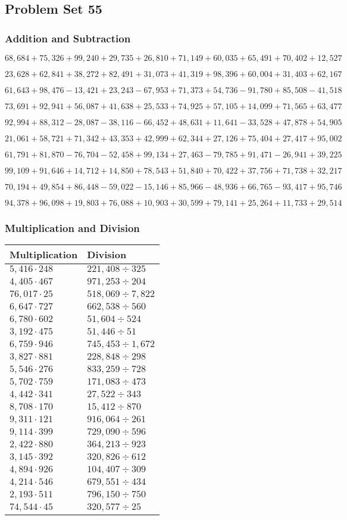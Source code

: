 \hypertarget{problem-set-55-3}{%
\subsection{Problem Set 55}\label{problem-set-55-3}}

\hypertarget{addition-and-subtraction-277}{%
\subsubsection{Addition and
Subtraction}\label{addition-and-subtraction-277}}

\(68,684+75,326+99,240+29,735+26,810+71,149+60,035+65,491+70,402+ 12,527\)

\(23,628+62,841+38,272+82,491+31,073+41,319+98,396+60,004+31,403+62,167\)

\(61,643+98,476-13,421+23,243-67,953+71,373+54,736-91,780+85,508-41,518\)

\(73,691+92,941+56,087+41,638+25,533+74,925+57,105+14,099+71,565+63,477\)

\(92,994+88,312-28,087-38,116-66,452+48,631+11,641-33,528+47,878+54,905\)

\(21,061+58,721+71,342+43,353+42,999+62,344+27,126+75,404+27,417+95,002\)

\(61,791+81,870-76,704-52,458+99,134+27,463-79,785+91,471-26,941+39,225\)

\(99,109+91,646+14,712+14,850+78,543+51,840+70,422+37,756+71,738+32,217\)

\(70,194+49,854+86,448-59,022-15,146+85,966-48,936+66,765-93,417+95,746\)

\(94,378+96,098+19,803+76,088+10,903+30,599+79,141+25,264+11,733+29,514\)

\hypertarget{multiplication-and-division-276}{%
\subsubsection{Multiplication and
Division}\label{multiplication-and-division-276}}

\begin{longtable}[]{@{}ll@{}}
\toprule
Multiplication & Division\tabularnewline
\midrule
\endhead
\(5,416\cdot248\) & \(221,408÷ 325\)\tabularnewline
\(4,405\cdot467\) & \(971,253÷204\)\tabularnewline
\(76,017\cdot25\) & \(518,069÷7,822\)\tabularnewline
\(6,647\cdot727\) & \(662,538÷560\)\tabularnewline
\(6,780\cdot602\) & \(51,604÷524\)\tabularnewline
\(3,192\cdot475\) & \(51,446÷51\)\tabularnewline
\(6,759\cdot946\) & \(745,453÷1,672\)\tabularnewline
\(3,827\cdot881\) & \(228,848÷298\)\tabularnewline
\(5,546\cdot276\) & \(833,259÷728\)\tabularnewline
\(5,702\cdot759\) & \(171,083÷473\)\tabularnewline
\(4,442\cdot341\) & \(27,522÷343\)\tabularnewline
\(8,708\cdot170\) & \(15,412÷870\)\tabularnewline
\(9,311\cdot121\) & \(916,064÷261\)\tabularnewline
\(9,114\cdot399\) & \(729,090÷596\)\tabularnewline
\(2,422\cdot880\) & \(364,213÷923\)\tabularnewline
\(3,145\cdot392\) & \(320,826÷612\)\tabularnewline
\(4,894\cdot926\) & \(104,407÷309\)\tabularnewline
\(4,214\cdot546\) & \(679,551÷434\)\tabularnewline
\(2,193\cdot511\) & \(796,150÷750\)\tabularnewline
\(74,544\cdot45\) & \(320,577÷25\)\tabularnewline
\bottomrule
\end{longtable}

